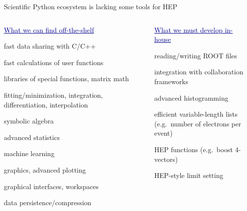 \documentclass[aspectratio=169]{beamer}
\begin{document}
\begin{frame}{Scientific Python ecosystem is lacking some tools for HEP}
\vspace{-0.5 cm}
\begin{columns}[t]
\begin{center}
\textcolor{darkblue}{\underline{\large What we can find off-the-shelf}}

\vspace{0.18 cm}
fast data sharing with C/C++

\vspace{0.18 cm}
fast calculations of user functions

\vspace{0.18 cm}
libraries of special functions, matrix math

\vspace{0.18 cm}
fitting/minimization, integration, differentiation, interpolation

\vspace{0.18 cm}
symbolic algebra

\vspace{0.18 cm}
advanced statistics

\vspace{0.18 cm}
machine learning

\vspace{0.18 cm}
graphics, advanced plotting

\vspace{0.18 cm}
graphical interfaces, workspaces

\vspace{0.18 cm}
data persistence/compression
\end{center}

\begin{center}
\textcolor{darkblue}{\underline{\large What we must develop in-house}}

\vspace{0.18 cm}
reading/writing ROOT files

\vspace{0.18 cm}
integration with collaboration frameworks

\vspace{0.18 cm}
advanced histogramming

\vspace{0.18 cm}
efficient variable-length lists \\ (e.g.\ number of electrons per event)

\vspace{0.18 cm}
HEP functions (e.g.\ boost 4-vectors)

\vspace{0.18 cm}
HEP-style limit setting
\end{center}
\end{columns}
\end{frame}
\end{document}
